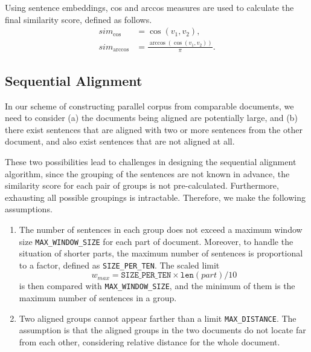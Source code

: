 \documentclass[runningheads]{llncs}
\begin{document}
Using sentence embeddings, cos and arccos measures are used to calculate the final similarity score, defined as follows.
\begin{align*}
sim_{\cos} & = \cos(v_1, v_2), \\
sim_{\arccos} & = \frac{\arccos(\cos(v_1, v_2))}{\pi}.
\end{align*}


\subsection{Sequential Alignment}

In our scheme of constructing parallel corpus from comparable documents, we need to consider (a) the documents being aligned are potentially large, and (b) there exist sentences that are aligned with two or more sentences from the other document, and also exist sentences that are not aligned at all.

These two possibilities lead to challenges in designing the sequential alignment algorithm, since the grouping of the sentences are not known in advance, the similarity score for each pair of groups is not pre-calculated. Furthermore, exhausting all possible groupings is intractable. Therefore, we make the following assumptions.
\begin{enumerate}
	\item The number of sentences in each group does not exceed a maximum window size \texttt{MAX\_WINDOW\_SIZE} for each part of document. Moreover, to handle the situation of shorter parts, the maximum number of sentences is proportional to a factor, defined as \texttt{SIZE\_PER\_TEN}. The scaled limit 
	$$w_{max} = \texttt{SIZE\_PER\_TEN} \times \texttt{len}(part) / 10$$
	is then compared with \texttt{MAX\_WINDOW\_SIZE}, and the minimum of them is the maximum number of sentences in a group.
	\item Two aligned groups cannot appear farther than a limit \texttt{MAX\_DISTANCE}. The assumption is that the aligned groups in the two documents do not locate far from each other, considering relative distance for the whole document. 
\end{enumerate}
\end{document}
